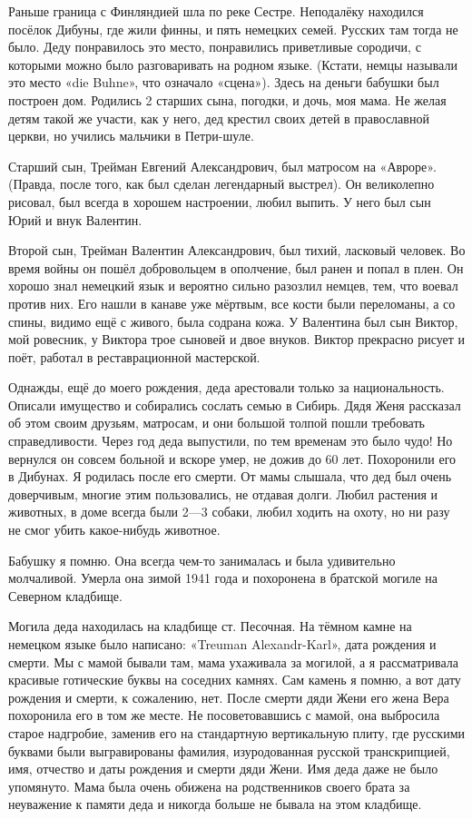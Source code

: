 Раньше граница с Финляндией шла по реке Сестре.
Неподалёку находился посёлок Дибуны, где жили финны, и пять немецких семей.
Русских там тогда не было.
Деду понравилось это место, понравились приветливые сородичи, с которыми можно было разговаривать на родном языке.
(Кстати, немцы называли это место «die Buhne», что означало «сцена»).
Здесь на деньги бабушки был построен дом.
Родились 2 старших сына, погодки, и дочь, моя мама.
Не желая детям такой же участи, как у него, дед крестил своих детей в православной церкви, но учились мальчики в Петри-шуле.

Старший сын, Трейман Евгений Александрович, был матросом на «Авроре».
(Правда,  после того, как был сделан легендарный выстрел).
Он великолепно рисовал, был всегда в хорошем настроении, любил выпить.
У него был сын Юрий и внук Валентин.

Второй сын, Трейман Валентин Александрович, был тихий, ласковый человек.
Во время войны он пошёл добровольцем в ополчение, был ранен и попал в плен.
Он хорошо знал немецкий язык и вероятно сильно разозлил немцев, тем, что воевал против них.
Его нашли в канаве уже мёртвым, все кости были переломаны, а со спины, видимо ещё с живого, была содрана кожа.
У Валентина был сын Виктор, мой ровесник, у Виктора трое сыновей и двое внуков.
Виктор прекрасно рисует и поёт, работал в реставрационной мастерской.

Однажды, ещё до моего рождения, деда арестовали только за национальность.
Описали имущество и собирались сослать семью в Сибирь.
Дядя Женя рассказал об этом своим друзьям, матросам, и они большой толпой пошли требовать справедливости.
Через год деда выпустили, по тем временам это было чудо!
Но вернулся он совсем больной и вскоре умер, не дожив до 60 лет.
Похоронили его в Дибунах.
Я родилась после его смерти.
От мамы слышала, что дед был очень доверчивым, многие этим пользовались, не отдавая долги.
Любил растения и животных, в доме всегда были 2---3 собаки, любил ходить на охоту, но ни разу не смог убить какое-нибудь животное.

Бабушку я помню.
Она всегда чем-то занималась и была удивительно молчаливой.
Умерла она зимой 1941 года и похоронена в братской могиле на Северном кладбище.

{\sloppy

Могила деда находилась на  кладбище ст.
Песочная.
На тёмном камне на немецком языке было написано: «Treuman Alexandr-Karl», дата рождения и смерти.
Мы с мамой бывали там, мама ухаживала за могилой, а я рассматривала красивые готические буквы на соседних камнях.
Сам камень я помню, а вот дату рождения и смерти, к сожалению, нет.
После смерти дяди Жени его жена Вера  похоронила его в том же месте.
Не посоветовавшись с мамой, она выбросила старое надгробие, заменив его на стандартную вертикальную плиту, где русскими буквами были выгравированы  фамилия, изуродованная русской транскрипцией, имя, отчество и даты рождения и смерти дяди Жени.
Имя деда даже не было упомянуто.
Мама была очень обижена на родственников своего брата за неуважение к памяти деда и никогда больше не бывала на этом кладбище.

}

